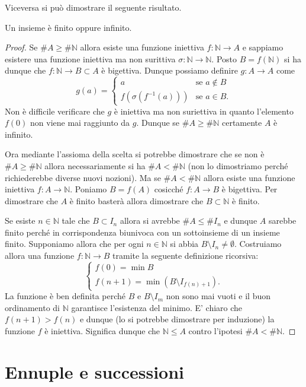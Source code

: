 \documentclass[italian,a4paper,hidelinks,headinclude]{scrartcl}
\newcommand{\NN}{{\mathbb N}}
\begin{document}
Viceversa si può dimostrare il seguente risultato.
\begin{theorem}
  Un insieme è finito oppure infinito.
\end{theorem}
%
\begin{proof}
Se $\# A \ge \#\NN$ allora esiste una funzione iniettiva $f\colon \NN \to A$
e sappiamo esistere una funzione iniettiva ma non surittiva $\sigma\colon \NN \to \NN$.
Posto $B=f(\NN)$ si ha dunque che $f\colon \NN\to B \subset A$ è bigettiva.
Dunque possiamo definire $g \colon A \to A$ come
\[
g(a) =
\begin{cases}
    a & \text{se $a\not \in B$}\\
    f(\sigma(f^{-1}(a))) & \text{se $a \in B$}.
\end{cases}
\]
Non è difficile verificare che $g$ è iniettiva ma non suriettiva in quanto
l'elemento $f(0)$
non viene mai raggiunto da $g$. Dunque se $\# A \ge \#\NN$ certamente $A$
è infinito.

Ora mediante l'assioma della scelta si potrebbe dimostrare che se non è
$\#A \ge \#\NN$ allora necessariamente si ha $\#A < \#\NN$
(non lo dimostriamo perché richiederebbe diverse nuovi nozioni).
Ma se $\#A < \#\NN$ allora esiste una funzione iniettiva $f\colon A \to \NN$.
Poniamo $B=f(A)$ cosicché $f\colon A \to B$ è bigettiva. Per dimostrare
che $A$ è finito basterà allora dimostrare che $B\subset \NN$ è finito.

Se esiste $n\in \NN$ tale che $B\subset I_n$ allora si avrebbe $\#A\le \#I_n$
e dunque $A$ sarebbe finito perché in corrispondenza biunivoca con un sottoinsieme
di un insieme finito. Supponiamo allora che per ogni $n\in \NN$ si abbia
$B\setminus I_n\neq \emptyset$. Costruiamo allora una funzione
$f\colon \NN \to B$ tramite la seguente definizione ricorsiva:
\[
 \begin{cases}
    f(0) = \min B \\
    f(n+1) = \min (B\setminus I_{f(n)+1}).
 \end{cases}
\]
La funzione è ben definita perché $B$ e $B\setminus I_m$ non sono mai vuoti
e il buon ordinamento di $\NN$ garantisce l'esistenza del minimo.
E' chiaro che $f(n+1) > f(n)$ e dunque (lo si potrebbe dimostrare per induzione)
la funzione $f$ è iniettiva. Significa dunque che $\NN\le A$ contro l'ipotesi
$\#A < \#\NN$.

\end{proof}

\section{Ennuple e successioni}
\end{document}

